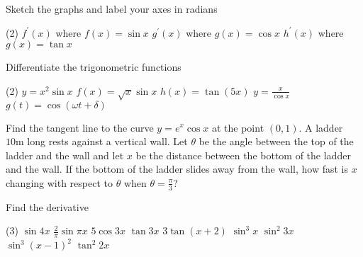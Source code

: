 \begin{Exercise}[title={Rate of Change},label=exRateOfChange]
\begin{Exercise}[title={Standard Derivatives},label=exStandardDerivatives]
\Question Sketch the graphs and label your axes in radians
	\begin{tasks}(2)
	\task $f^{ \prime } (x)$ where $f (x) =\sin  x$ %
	\task $g^{ \prime } (x)$ where $g (x) =\cos  x$  %
	\task $h^{ \prime } (x)$ where $g (x)  =\tan x$  %
\end{tasks}

\Question Differentiate the trigonometric functions
\begin{tasks}(2)
	\task $y =x^{2} \sin  x$ %
	\task $f (x) =\sqrt{x} \sin  x$ %
	\task $h (x) =\tan  (5 x)$ %
	\task $y =\frac{x}{\cos  x}$ %
	\task $g (t) =\cos  (\omega  t +\delta )$ %
\end{tasks}

\Question Find the tangent line to the curve $y =e^{x} \cos  x$ at the point $(0 ,1)$. %
\Question A ladder $10 \mbox{m}$ long rests against a vertical wall. Let $\theta $ be the angle between the top of the ladder and the wall and let $x$ be the distance between the bottom of the ladder and the wall. If the bottom of the ladder slides away from the wall, how fast is $x$ changing with respect to $\theta $ when $\theta  =\frac{\pi }{3}$? %

	\Question Find the derivative
\begin{tasks}(3)
	\task  $\sin  4 x$ %
	\task $\frac{2}{\pi } \sin  \pi  x$ %
	\task $5 \cos  3 x$ %
	\task $\tan  3 x$ 	%
	\task $3 \tan  \left (x +2\right )$  %
	\task $\sin ^{3} x$ %
	\task $\sin ^{2} 3 x$ %
	\task $\sin ^{3} \left (x -1\right )^{2}$ %
	\task $\tan ^{2} 2 x$ %
	
\end{tasks}

\end{Exercise}
\begin{Answer}[ref={exStandardDerivatives}]
	

\end{Answer}
\end{Exercise}
